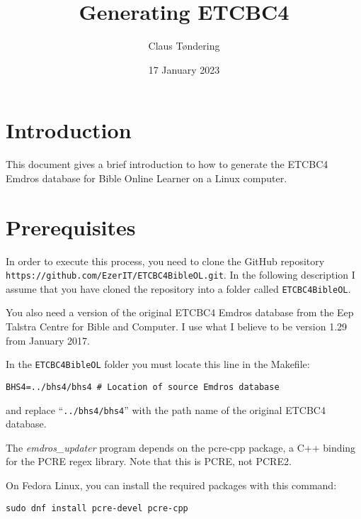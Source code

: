 \documentclass[11pt,oneside,a4paper,article]{memoir}
\title{Generating ETCBC4}
\author{Claus Tøndering}
\date{17 January 2023}
\begin{document}
\maketitle


\chapter{Introduction}

This document gives a brief introduction to how to generate the ETCBC4 Emdros database for Bible
Online Learner on a Linux computer.

\chapter{Prerequisites}

In order to execute this process, you need to clone the GitHub repository
\texttt{https://github.com/\-EzerIT/ETCBC4BibleOL.git}. In the following description I assume that you
have cloned the repository into a folder called \texttt{ETCBC4BibleOL}.

You also need a version of the original ETCBC4 Emdros database from the Eep Talstra Centre for Bible
and Computer. I use what I believe to be version 1.29 from January 2017.

In the \texttt{ETCBC4BibleOL} folder you must locate this line in the Makefile:

\vspace{1ex}

\quad\texttt{BHS4=../bhs4/bhs4  \# Location of source Emdros database}

\vspace{1ex}

\noindent
and replace ``\texttt{../bhs4/bhs4}'' with the path name of the original ETCBC4 database.

The \emph{emdros\_updater} program depends on the pcre-cpp package, a
C++ binding for the PCRE regex library. Note that this is PCRE, not
PCRE2.

On Fedora Linux, you can install the required packages with this
command:

\vspace{1ex}

\quad\texttt{sudo dnf install pcre-devel pcre-cpp}
\end{document}
